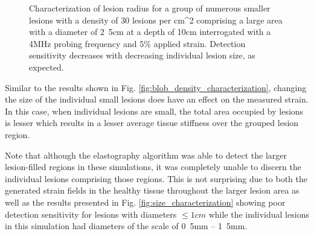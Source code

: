 			\begin{figure}[!t]
				\centering
				\caption{Characterization of lesion radius for a group of numerous smaller lesions with a density of 30 lesions per \unit{}{cm^2} comprising a large area with a diameter of \unit{2.5}{cm} at a depth of \unit{10}{cm} interrogated with a \unit{4}{MHz} probing frequency and \unit{5}{\%} applied strain. Detection sensitivity decreases with decreasing individual lesion size, as expected.}
				\label{fig:blob_radius_characterization}
			\end{figure}

			Similar to the results shown in Fig. \ref{fig:blob_density_characterization}, changing the size of the individual small lesions does have an effect on the measured strain. In this case, when individual lesions are small, the total area occupied by lesions is lesser which results in a lesser average tissue stiffness over the grouped lesion region.

			Note that although the elastography algorithm was able to detect the larger lesion-filled regions in these simulations, it was completely unable to discern the individual lesions comprising those regions. This is not surprising due to both the generated strain fields in the healthy tissue throughout the larger lesion area as well as the results presented in Fig. \ref{fig:size_characterization} showing poor detection sensitivity for lesions with diameters $\leq \unit{1}{cm}$ while the individual lesions in this simulation had diameters of the scale of \unit{0.5}{mm} -- \unit{1.5}{mm}.

